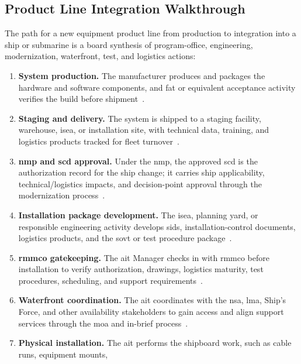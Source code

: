 \documentclass[../main.tex]{subfiles}
\begin{document}
\subsection{Product Line Integration Walkthrough}
The path for a new equipment product line from production to integration into a ship or submarine is a board synthesis of
program-office, engineering, modernization, waterfront, test, and logistics actions:
\begin{enumerate}
  \item \textbf{System production.} The manufacturer produces and packages the hardware and software components, and
        \ac{fat} or equivalent acceptance activity verifies the build before shipment~\autocite{edo-4-1-4-ait-fundamentals-2025}.
  \item \textbf{Staging and delivery.} The system is shipped to a staging facility, warehouse, \ac{isea}, or installation
        site, with technical data, training, and logistics products tracked for fleet turnover~\autocite{NAVSEA-Logistics-Planning-Processes-Policy-2026}.
  \item \textbf{\ac{nmp} and \ac{scd} approval.} Under the \ac{nmp}, the approved \ac{scd} is the authorization record
        for the ship change; it carries ship applicability, technical/logistics impacts, and decision-point approval
        through the modernization process~\autocite{edo-4-1-2-navy-modernization-2025,JFMM-VolVI-RevD-Chg5-2025}.
  \item \textbf{Installation package development.} The \ac{isea}, planning yard, or responsible engineering activity
        develops \acp{sid}, installation-control documents, logistics products, and the \ac{sovt} or test procedure
        package~\autocite{TS9090-310,NAVSEA-Logistics-Planning-Processes-Policy-2026}.
  \item \textbf{\ac{rmmco} gatekeeping.} The \ac{ait} Manager checks in with \ac{rmmco} before installation to verify
        authorization, drawings, logistics maturity, test procedures, scheduling, and support requirements~\autocite{JFMM-VolVI-RevD-Chg5-2025,TS9090-310}.
  \item \textbf{Waterfront coordination.} The \ac{ait} coordinates with the \ac{nsa}, \ac{lma}, Ship's Force, and other
        availability stakeholders to gain access and align support services through the \ac{moa} and in-brief
        process~\autocite{edo-4-1-4-ait-fundamentals-2025,TS9090-310}.
  \item \textbf{Physical installation.} The \ac{ait} performs the shipboard work, such as cable runs, equipment mounts,

\end{enumerate}
\end{document}
